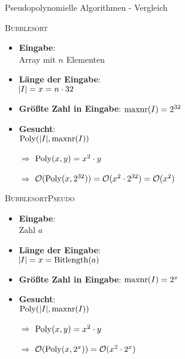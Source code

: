 \begin{frame}{Pseudopolynomielle Algorithmen - Vergleich}
	\begin{minipage}[t]{0.5\textwidth}
		\textsc{Bubblesort}
		\begin{itemize}
			\item \textbf{Eingabe}: \\ Array mit $n$ Elementen
			\item \textbf{Länge der Eingabe}: \\ $\abs{I} = x = n\cdot 32$
			\item \textbf{Größte Zahl in Eingabe}: $\operatorname{maxnr}(I)=2^{32}$
			\item \textbf{Gesucht}: \\ $\operatorname{Poly}(\vert I \vert, \operatorname{maxnr}(I))$
			\pause
			\item[$\Rightarrow$] $\operatorname{Poly}(x,y)=x^2\cdot y$
			\item[$\Rightarrow$] $\mathcal{O}(\operatorname{Poly}(x,2^{32})) = \mathcal{O}(x^2 \cdot 2^{32}) = \mathcal{O}(x^2)$
		\end{itemize}
	\end{minipage}
	\pause
	\hspace{2mm}
	\begin{minipage}[t]{0.47\textwidth}
		\textsc{BubblesortPseudo}
		\begin{itemize}
			\item \textbf{Eingabe}: \\ Zahl $a$
			\item \textbf{Länge der Eingabe}: \\ $\abs{I} = x = \operatorname{Bitlength}(a)$
			\item \textbf{Größte Zahl in Eingabe}: $\operatorname{maxnr}(I)=2^x$
			\item \textbf{Gesucht}: \\ $\operatorname{Poly}(\vert I \vert, \operatorname{maxnr}(I))$
			\pause
			\item[$\Rightarrow$] $\operatorname{Poly}(x,y)=x^2\cdot y$
			\item[$\Rightarrow$] $\mathcal{O}(\operatorname{Poly}(x,2^x)) = \mathcal{O}(x^2 \cdot 2^x)$
		\end{itemize}
	\end{minipage}
\end{frame}

